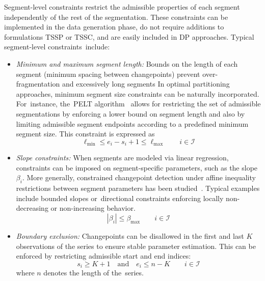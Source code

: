 \documentclass[mathematics,article,accept,pdftex,moreauthors]{Definitions/mdpi}
\begin{document}
Segment-level constraints restrict the admissible properties of each segment independently of the rest of the segmentation. These constraints can be implemented in the data generation phase, do not require additions to formulations TSSP or TSSC, and are easily included in DP approaches. 
Typical segment-level constraints~include:
\begin{itemize}
	\item {\it Minimum and maximum segment length: %
}	Bounds on the length of each segment (minimum spacing between changepoints) prevent over-fragmentation and excessively long segments In optimal partitioning approaches,  minimum segment size constraints can be naturally incorporated. For~instance, the~PELT algorithm~\cite{KFE12} allows for restricting the set of admissible segmentations by enforcing a lower bound on segment length and also by limiting admissible segment endpoints according to a predefined minimum segment size. This constraint is expressed as
\begin{equation}
		\ell_{\min} \leq e_i - s_i + 1 \leq \ell_{\max} \qquad i \in \mathcal{I}
	\end{equation}
	
	\item {\it Slope constraints:}
	When segments are modeled via linear regression, constraints can be imposed on segment-specific parameters, such as the slope $\beta_i$. More generally, constrained changepoint detection under affine inequality restrictions between segment parameters has been studied~\cite{hocking2017constrained}. Typical examples include bounded slopes or~directional constraints enforcing locally non-decreasing or non-increasing behavior.
\begin{equation}
		|\beta_i| \leq \beta_{\max} \qquad i \in \mathcal{I}
	\end{equation}
	 
	\item {\it Boundary exclusion:}
	Changepoints can be disallowed in the first and last $K$ observations of the series to ensure stable parameter estimation. This can be enforced by restricting admissible start and end indices:
\begin{equation}
		s_i \geq K + 1 \quad \text{and} \quad e_i \leq n - K  \qquad i \in \mathcal{I}
	\end{equation}
	where $n$ denotes the length of the~series.
	

\end{itemize}
\end{document}
